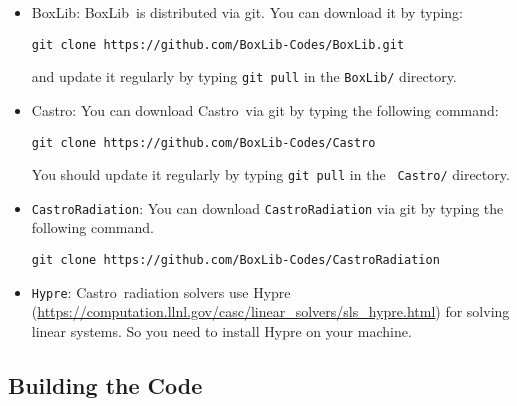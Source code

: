 \documentclass[11pt,letterpaper]{article}
\newcommand{\castro}{{\sf Castro}}
\newcommand{\boxlib}{{\sf BoxLib}}
\begin{document}
\begin{itemize}

\item \boxlib: \boxlib\ is distributed via git.  You can download it
  by typing:
\begin{verbatim}
git clone https://github.com/BoxLib-Codes/BoxLib.git
\end{verbatim}
and update it regularly by typing {\tt git pull} in the {\tt BoxLib/}
directory.

\item \castro: You can download \castro\ via git by typing the
  following command:
\begin{verbatim}
git clone https://github.com/BoxLib-Codes/Castro
\end{verbatim}
You should update it regularly by typing {\tt git pull} in the {\tt
  Castro/} directory.

\item {\tt CastroRadiation}: 
You can download {\tt CastroRadiation} via git by typing the following
command.
\begin{verbatim}
git clone https://github.com/BoxLib-Codes/CastroRadiation
\end{verbatim}

\item {\tt Hypre}:
\castro\ radiation solvers use Hypre
(\url{https://computation.llnl.gov/casc/linear_solvers/sls_hypre.html})
for solving linear systems.  So you need to install Hypre on your
machine.
\end{itemize}

\subsection{Building the Code}
\end{document}
